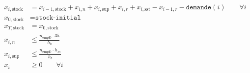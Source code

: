 \documentclass[12pt,oneside,a4paper]{article}
\begin{document}
\begin{align*}
  x_{i,\text{stock}} &= x_{i-1,\text{stock}} + x_{i,n} + x_{i,\text{sup}} 
  + x_{i,r} + x_{i,\text{sst}} - x_{i-1,r} - \texttt{demande}(i) \qquad \forall i \\
  x_{0,\text{stock}} &= \texttt{stock-initial} \\
  x_{T,\text{stock}} &= x_{0,\text{stock}} \\
  x_{i,n} &\leq \frac{n_{\text{empl0}} \cdot 35}{h_b} \\
  x_{i,\text{sup}} &\leq \frac{n_{\text{empl0}} \cdot h_{ss}}{h_{b}} \\
  x_i &\geq 0 \qquad \forall i \\
\end{align*}
\end{document}
